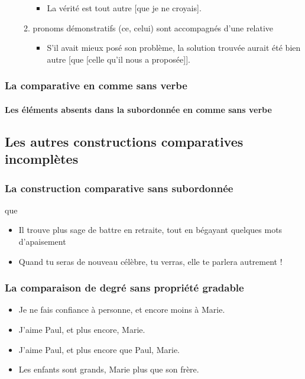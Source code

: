 \documentclass[UTF8]{report}
\begin{document}
\begin{enumerate}
\begin{enumerate}
\begin{itemize}
            \item La vérité est tout autre [que je ne croyais].
        \end{itemize}
        \item pronoms démonstratifs (ce, celui) sont accompagnés d’une relative
        \begin{itemize}
            \item S’il avait mieux posé son problème, la solution trouvée aurait été bien autre [que [celle qu’il nous a proposée]].
        \end{itemize}
    \end{enumerate}
\end{enumerate}

\subsubsection{La comparative en comme sans verbe}
\paragraph{Les éléments absents dans la subordonnée en comme sans verbe}


\subsection{Les autres constructions comparatives incomplètes}
\subsubsection{La construction comparative sans subordonnée}
que 
\begin{itemize}
    \item Il trouve plus sage de battre en retraite, tout en bégayant quelques mots d’apaisement 
    \item Quand tu seras de nouveau célèbre, tu verras, elle te parlera autrement !
\end{itemize}

\subsubsection{La comparaison de degré sans propriété gradable}

\begin{itemize}
    \item Je ne fais confiance à personne, et encore moins à Marie.
    \item J’aime Paul, et plus encore, Marie.
    \item J’aime Paul, et plus encore que Paul, Marie.
    \item Les enfants sont grands, Marie plus que son frère.
\end{itemize}
\end{document}
